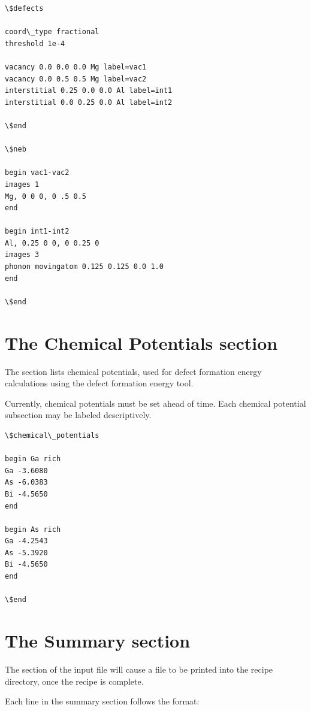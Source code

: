 \documentclass[letterpaper,10pt,english]{sphinxmanual}
\begin{document}
\begin{Verbatim}[commandchars=\\\{\}]
\$defects

coord\_type fractional
threshold 1e-4

vacancy 0.0 0.0 0.0 Mg label=vac1
vacancy 0.0 0.5 0.5 Mg label=vac2
interstitial 0.25 0.0 0.0 Al label=int1
interstitial 0.0 0.25 0.0 Al label=int2

\$end

\$neb

begin vac1-vac2
images 1
Mg, 0 0 0, 0 .5 0.5
end

begin int1-int2
Al, 0.25 0 0, 0 0.25 0
images 3
phonon movingatom 0.125 0.125 0.0 1.0
end

\$end
\end{Verbatim}


\section{The Chemical Potentials section}
\label{3_1_7_chemicalpotentials:the-chemical-potentials-section}\label{3_1_7_chemicalpotentials::doc}
The  section lists chemical potentials, used for defect formation energy calculations using the defect formation energy tool.

Currently, chemical potentials must be set ahead of time. Each chemical potential subsection may be labeled descriptively.

\begin{Verbatim}[commandchars=\\\{\}]
\$chemical\_potentials

begin Ga rich
Ga -3.6080
As -6.0383
Bi -4.5650
end

begin As rich
Ga -4.2543
As -5.3920
Bi -4.5650
end

\$end
\end{Verbatim}


\section{The Summary section}
\label{3_1_8_summary:the-summary-section}\label{3_1_8_summary::doc}
The  section of the input file will cause a  file to be printed into the recipe directory, once the recipe is complete.

Each line in the summary section follows the format:
\end{document}
